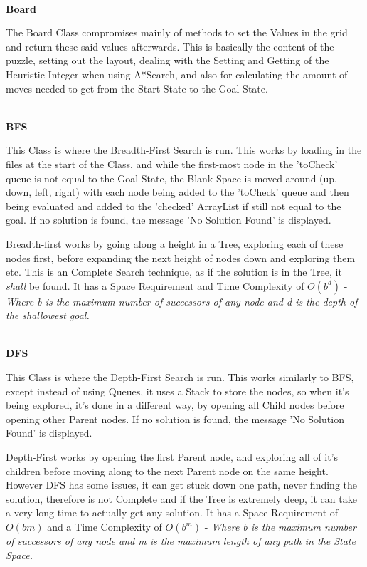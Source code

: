 \documentclass[11pt]{article} %
\begin{document}
			\hspace{0pt} \\
			\textbf{Board}
	
			The Board Class compromises mainly of methods to set the Values in the grid and return these said values afterwards. This is basically the content of the puzzle, setting out the layout, dealing with the Setting and Getting of the Heuristic Integer when using A*Search, and also for calculating the amount of moves needed to get from the Start State to the Goal State.
	
			\hspace{0pt} \\
			\textbf{BFS}
	
			This Class is where the Breadth-First Search is run. This works by loading in the files at the start of the Class, and while the first-most node in the 'toCheck' queue is not equal to the Goal State, the Blank Space is moved around (up, down, left, right) with each node being added to the 'toCheck' queue and then being evaluated and added to the 'checked' ArrayList if still not equal to the goal. If no solution is found, the message 'No Solution Found' is displayed.
	
			\setlength{\parindent}{15pt} %
			Breadth-first works by going along a height in a Tree, exploring each of these nodes first, before expanding the next height of nodes down and exploring them etc. This is an Complete Search technique, as if the solution is in the Tree, it \textit{shall} be found. It has a Space Requirement and Time Complexity of \begin{math} O(b^d) \end{math} - \textit{Where b is the maximum number of successors of any node and d is the depth of the shallowest goal.}
	
			\setlength{\parindent}{0pt} %
			\hspace{0pt} \\
			\textbf{DFS}
	
			This Class is where the Depth-First Search is run. This works similarly to BFS, except instead of using Queues, it uses a Stack to store the nodes, so when it's being explored, it's done in a different way, by opening all Child nodes before opening other Parent nodes. If no solution is found, the message 'No Solution Found' is displayed.
	
			\setlength{\parindent}{15pt} %
	Depth-First works by opening the first Parent node, and exploring all of it's children before moving along to the next Parent node on the same height. However DFS has some issues, it can get stuck down one path, never finding the solution, therefore is not Complete and if the Tree is extremely deep, it can take a very long time to actually get any solution. It has a Space Requirement of \begin{math} O(bm) \end{math} and a Time Complexity of \begin{math} O(b^m) \end{math} - \textit{Where b is the maximum number of successors of any node and m is the maximum length of any path in the State Space.}
	
\end{document}
